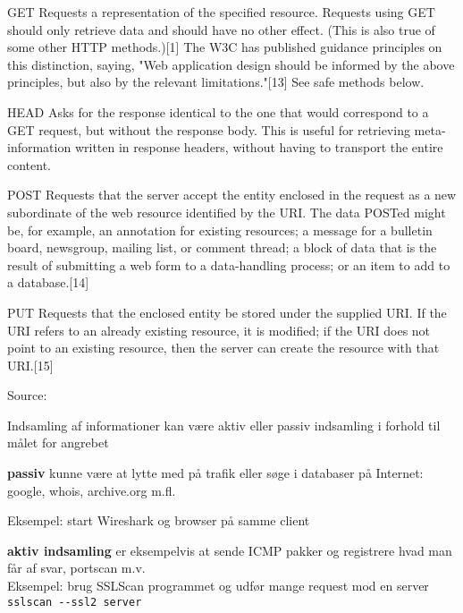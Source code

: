 \documentclass[Screen16to9,17pt]{foils}
\begin{document}
\begin{list2}
\item [GET]{\small
Requests a representation of the specified resource. Requests using GET should only retrieve data and should have no other effect. (This is also true of some other HTTP methods.)[1] The W3C has published guidance principles on this distinction, saying, "Web application design should be informed by the above principles, but also by the relevant limitations."[13] See safe methods below.}
\item [HEAD]{\small
Asks for the response identical to the one that would correspond to a GET request, but without the response body. This is useful for retrieving meta-information written in response headers, without having to transport the entire content.}
\item [POST]{\small
Requests that the server accept the entity enclosed in the request as a new subordinate of the web resource identified by the URI. The data POSTed might be, for example, an annotation for existing resources; a message for a bulletin board, newsgroup, mailing list, or comment thread; a block of data that is the result of submitting a web form to a data-handling process; or an item to add to a database.[14]}
\item [PUT]{\small
Requests that the enclosed entity be stored under the supplied URI. If the URI refers to an already existing resource, it is modified; if the URI does not point to an existing resource, then the server can create the resource with that URI.[15]}
\end{list2}

Source: 



\begin{list1}
\item Indsamling af informationer kan være aktiv eller passiv indsamling i forhold
  til målet for angrebet
\item {\bf passiv} kunne være at lytte med på trafik eller søge i databaser
  på Internet: google, whois, archive.org m.fl.

Eksempel: start Wireshark og browser på samme client

\vskip 1cm
\item {\bf aktiv indsamling} er eksempelvis at sende ICMP pakker og
  registrere hvad man får af svar, portscan m.v.\\

Eksempel: brug SSLScan programmet og udfør mange request mod en server\\
\verb+sslscan --ssl2 server+
\end{list1}
\end{document}
